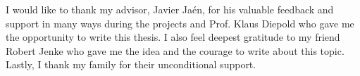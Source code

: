 

\begin{acknowledgements}      %

I would like to thank my advisor, Javier Jaén, for his valuable feedback and support in many ways during the projects and Prof. Klaus Diepold who gave me the opportunity to write this thesis. I also feel deepest gratitude to my friend Robert Jenke who gave me the idea and the courage to write about this topic. Lastly, I thank my family for their unconditional support.

\end{acknowledgements}



